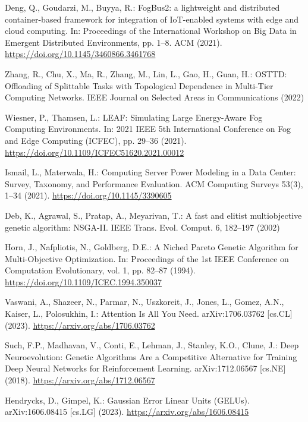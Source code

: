 \documentclass{svproc}
\begin{document}
\begin{thebibliography}{99}
Deng, Q., Goudarzi, M., Buyya, R.: FogBus2: a lightweight and distributed container-based framework for integration of IoT-enabled systems with edge and cloud computing. In: Proceedings of the International Workshop on Big Data in Emergent Distributed Environments, pp. 1--8. ACM (2021). \url{https://doi.org/10.1145/3460866.3461768}

Zhang, R., Chu, X., Ma, R., Zhang, M., Lin, L., Gao, H., Guan, H.: OSTTD: Offloading of Splittable Tasks with Topological Dependence in Multi-Tier Computing Networks. IEEE Journal on Selected Areas in Communications (2022)

Wiesner, P., Thamsen, L.: LEAF: Simulating Large Energy-Aware Fog Computing Environments. In: 2021 IEEE 5th International Conference on Fog and Edge Computing (ICFEC), pp. 29--36 (2021). \url{https://doi.org/10.1109/ICFEC51620.2021.00012}

Ismail, L., Materwala, H.: Computing Server Power Modeling in a Data Center: Survey, Taxonomy, and Performance Evaluation. ACM Computing Surveys 53(3), 1--34 (2021). \url{https://doi.org/10.1145/3390605}


Deb, K., Agrawal, S., Pratap, A., Meyarivan, T.: A fast and elitist multiobjective genetic algorithm: NSGA-II. IEEE Trans. Evol. Comput. 6, 182--197 (2002)

Horn, J., Nafpliotis, N., Goldberg, D.E.: A Niched Pareto Genetic Algorithm for Multi-Objective Optimization. In: Proceedings of the 1st IEEE Conference on Computation Evolutionary, vol. 1, pp. 82--87 (1994). \url{https://doi.org/10.1109/ICEC.1994.350037}

Vaswani, A., Shazeer, N., Parmar, N., Uszkoreit, J., Jones, L., Gomez, A.N., Kaiser, L., Polosukhin, I.: Attention Is All You Need. arXiv:1706.03762 [cs.CL] (2023). \url{https://arxiv.org/abs/1706.03762}

Such, F.P., Madhavan, V., Conti, E., Lehman, J., Stanley, K.O., Clune, J.: Deep Neuroevolution: Genetic Algorithms Are a Competitive Alternative for Training Deep Neural Networks for Reinforcement Learning. arXiv:1712.06567 [cs.NE] (2018). \url{https://arxiv.org/abs/1712.06567}

Hendrycks, D., Gimpel, K.: Gaussian Error Linear Units (GELUs). arXiv:1606.08415 [cs.LG] (2023). \url{https://arxiv.org/abs/1606.08415}


\end{thebibliography}
\end{document}
